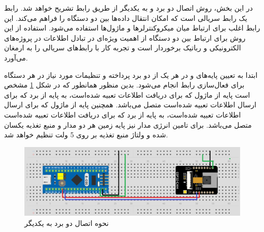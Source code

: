 در این بخش، روش اتصال دو برد  و  به یکدیگر از طریق رابط  تشریح خواهد شد. رابط  یک رابط سریالی است که امکان انتقال داده‌ها بین دو دستگاه را فراهم می‌کند. این رابط اغلب برای ارتباط میان میکروکنترلرها و ماژول‌ها استفاده می‌شود. استفاده از این روش برای ارتباط بین دو دستگاه از اهمیت ویژه‌ای در تبادل اطلاعات در پروژه‌های الکترونیکی و رباتیک برخوردار است و تجربه کار با رابط‌های سریالی را به ارمغان می‌آورد.

ابتدا به تعیین پایه‌های  و  در هر یک از دو برد پرداخته و تنظیمات مورد نیاز در هر دستگاه برای فعال‌سازی رابط  انجام می‌شود. بدین منظور همانطور که در شکل 
\ref{اتصال دو برد}
مشخص است پایه
از ماژول
که برای دریافت اطلاعات تعبیه شده‌است، به پایه
از برد
که برای ارسال اطلاعات تعبیه شده‌است متصل می‌باشد. همچنین پایه
از ماژول
که برای ارسال اطلاعات تعبیه شده‌است، به پایه
از برد
که برای دریافت اطلاعات تعبیه شده‌است متصل می‌باشد. برای تامین انرژی مدار نیز پایه زمین هر دو مدار و منبع تغذیه یکسان شده و ولتاژ منبع تغذیه بر روی 5 ولت تنظیم خواهد شد.

\begin{figure}[H]
	\centering
	\includegraphics[width=1\textwidth]{./images/Chapter3/TwoBoardConnection}	
	\caption{نحوه اتصال دو برد  به یکدیگر}
	\label{اتصال دو برد}
\end{figure}



